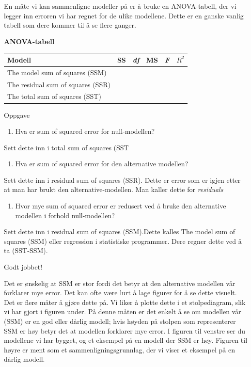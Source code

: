 \documentclass[
]{book}
\providecommand{\tightlist}{%
  \setlength{\itemsep}{0pt}\setlength{\parskip}{0pt}}
\begin{document}
En måte vi kan sammenligne modeller på er å bruke en ANOVA-tabell, der vi legger inn erroren vi har regnet for de ulike modellene. Dette er en ganske vanlig tabell som dere kommer til å se flere ganger.

\textbf{ANOVA-tabell}

\begin{longtable}[]{@{}llllll@{}}
\toprule
Modell & SS & \emph{df} & MS & \emph{F} & \(R^2\)\tabularnewline
\midrule
\endhead
The model sum of squares (SSM) & & & & &\tabularnewline
The residual sum of squares (SSR) & & & & &\tabularnewline
The total sum of squares (SST) & & & & &\tabularnewline
\bottomrule
\end{longtable}

{Oppgave}

\begin{enumerate}
\def\labelenumi{\alph{enumi}.}
\tightlist
\item
  Hva er sum of squared error for null-modellen?
\end{enumerate}

Sett dette inn i total sum of squares (SST

\begin{enumerate}
\def\labelenumi{\alph{enumi}.}
\setcounter{enumi}{1}
\tightlist
\item
  Hva er sum of squared error for den alternative modellen?
\end{enumerate}

Sett dette inn i residual sum of squares (SSR). Dette er error som er igjen etter at man har brukt den alternative-modellen. Man kaller dette for \emph{residuals}

\begin{enumerate}
\def\labelenumi{\alph{enumi}.}
\setcounter{enumi}{2}
\tightlist
\item
  Hvor mye sum of squared error er redusert ved å bruke den alternative modellen i forhold null-modellen?
\end{enumerate}

Sett dette inn i residual sum of squares (SSM).Dette kalles The model sum of squares (SSM) eller regression i statistiske programmer. Dere regner dette ved å ta (SST-SSM).

{Godt jobbet!}

Det er ønskelig at SSM er stor fordi det betyr at den alternative modellen vår forklarer mye error. Det kan ofte være lurt å lage figurer for å se dette visuelt. Det er flere måter å gjøre dette på. Vi liker å plotte dette i et stolpediagram, slik vi har gjort i figuren under. På denne måten er det enkelt å se om modellen vår (SSM) er en god eller dårlig modell; hvis høyden på stolpen som representerer SSM er høy betyr det at modellen forklarer mye error. I figuren til venstre ser du modellene vi har bygget, og et eksempel på en modell der SSM er høy. Figuren til høyre er ment som et sammenligningsgrunnlag, der vi viser et eksempel på en dårlig modell.
\end{document}
